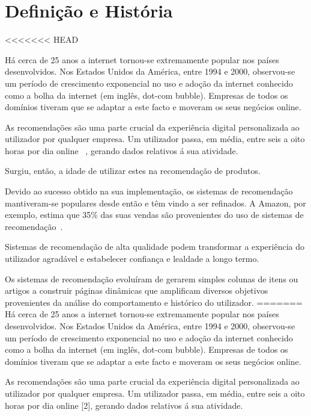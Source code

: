 \section{Definição e História}

<<<<<<< HEAD

\par Há cerca de 25 anos a internet tornou-se extremamente popular nos países desenvolvidos. Nos Estados Unidos da América, entre 1994 e 2000, observou-se um período de crescimento exponencial no uso e adoção da internet conhecido como a bolha da internet (em inglês, dot-com bubble). Empresas de todos os domínios tiveram que se adaptar a este facto e moveram os seus negócios online. 

\par As recomendações são uma parte crucial da experiência digital personalizada ao utilizador por qualquer empresa. Um utilizador passa, em média, entre seis a oito horas por dia online ~\cite{ref_history1}, gerando dados relativos á sua atividade. 

\par Surgiu, então, a idade de utilizar estes na recomendação de produtos. 

\par Devido ao sucesso obtido na sua implementação, os sistemas de recomendação mantiveram-se populares desde então e têm vindo a ser refinados. A Amazon, por exemplo, estima que 35\% das suas vendas são provenientes do uso de sistemas de recomendação~\cite{ref_history2}. 

\par Sistemas de recomendação de alta qualidade podem transformar a experiência do utilizador agradável e estabelecer confiança e lealdade a longo termo. 

\par Os sistemas de recomendação evoluíram de gerarem simples colunas de itens ou artigos a construir páginas dinâmicas que amplificam diversos objetivos provenientes da análise do comportamento e histórico do utilizador. 
=======
Há cerca de 25 anos a internet tornou-se extremamente popular nos países desenvolvidos. Nos Estados Unidos da América, entre 1994 e 2000, observou-se um período de crescimento exponencial no uso e adoção da internet conhecido como a bolha da internet (em inglês, dot-com bubble). Empresas de todos os domínios tiveram que se adaptar a este facto e moveram os seus negócios online. 

As recomendações são uma parte crucial da experiência digital personalizada ao utilizador por qualquer empresa. Um utilizador passa, em média, entre seis a oito horas por dia online [2], gerando dados relativos á sua atividade. 

